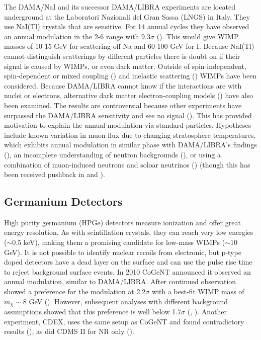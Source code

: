 The DAMA/NaI and its successor DAMA/LIBRA experiments are located underground at the Laboratori Nazionali del Gran Sassa (LNGS) in
Italy.  They use NaI(Tl) crystals that are sensitive.  For 14 annual cycles they have observed an annual modulation in the 2-6 \kevee
range with 9.3$\sigma$ ().  This would give WIMP masses of 10-15 GeV for scattering off Na
and 60-100 GeV for I.  Because NaI(Tl) cannot distinguish scatterings by different particles there is doubt on if their signal
is caused by WIMPs, or even dark matter.  Outside of spin-independent, spin-dependent or mixed coupling ()
and inelastic scattering () WIMPs 
have been considered.  Because DAMA/LIBRA cannot know if the interactions are with nuclei or electrons, alternative dark matter
electron-coupling models () have also been examined.  The results are controversial because other experiments
have surpassed the DAMA/LIBRA sensitivity and see no signal ().  This has provided motivation to explain the annual modulation via
standard particles.  Hypotheses include known variation in muon flux due to changing stratosphere temperatures, which exhibits
annual modulation in similar phase with DAMA/LIBRA's findings (), an incomplete understanding of neutron backgrounds
(), or using a combination of muon-induced neutrons and soloar neutrinos () (though this
has been received pushback in  and ).


\subsection{Germanium Detectors} \label{subsec:germanium}
High purity germanium (HPGe) detectors measure ionization and offer great energy resolution.  As with scintillation crystals,
they can reach very low energies ($\sim$0.5 keV), making them a promising candidate for low-mass WIMPs ($\sim 10$ GeV).  It is not
possible to identify nuclear recoils from electronic, but p-type doped detectors have a dead layer on the surface and can use the
pulse rise time to reject background surface events.  In 2010 CoGeNT
announced it observed an annual modulation, similar to DAMA/LIBRA.  After continued observation showed a preference for the modulation
at 2.2$\sigma$ with a best-fit WIMP mass of $m_{\chi}\sim 8$ GeV ().  However, subsequent analyses with different
background assumptions showed that this preference is well below 1.7$\sigma$ (, ).  Another
experiment, CDEX, uses the same setup as CoGeNT and found contradictory results (), as did CDMS II for NR only
().


